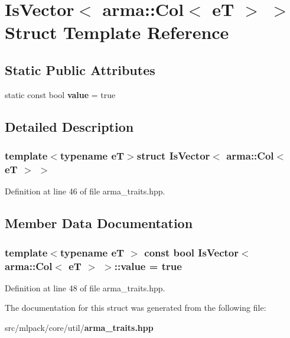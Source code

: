 \section{Is\-Vector$<$ arma\-:\-:Col$<$ e\-T $>$ $>$ Struct Template Reference}
\label{structIsVector_3_01arma_1_1Col_3_01eT_01_4_01_4}
\subsection*{Static Public Attributes}
\begin{DoxyCompactItemize}
\item 
static const bool {\bf value} = true
\end{DoxyCompactItemize}


\subsection{Detailed Description}
\subsubsection*{template$<$typename e\-T$>$struct Is\-Vector$<$ arma\-::\-Col$<$ e\-T $>$ $>$}



Definition at line 46 of file arma\-\_\-traits.\-hpp.



\subsection{Member Data Documentation}
\subsubsection[{value}]{\setlength{\rightskip}{0pt plus 5cm}template$<$typename e\-T $>$ const bool {\bf Is\-Vector}$<$ arma\-::\-Col$<$ e\-T $>$ $>$\-::value = true\hspace{0.3cm}{\ttfamily [static]}}\label{structIsVector_3_01arma_1_1Col_3_01eT_01_4_01_4_acf47df24029079ca1d890c32c148814d}


Definition at line 48 of file arma\-\_\-traits.\-hpp.



The documentation for this struct was generated from the following file\-:\begin{DoxyCompactItemize}
\item 
src/mlpack/core/util/{\bf arma\-\_\-traits.\-hpp}\end{DoxyCompactItemize}
